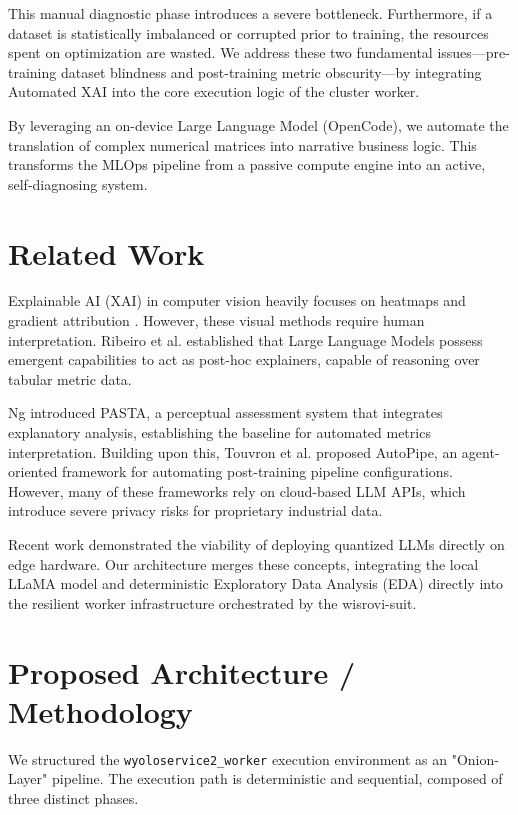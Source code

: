 \documentclass[10pt,twocolumn,letterpaper]{article}
\begin{document}
This manual diagnostic phase introduces a severe bottleneck. Furthermore, if a dataset is statistically imbalanced or corrupted prior to training, the resources spent on optimization are wasted. We address these two fundamental issues—pre-training dataset blindness and post-training metric obscurity—by integrating Automated XAI into the core execution logic of the cluster worker.

By leveraging an on-device Large Language Model (OpenCode), we automate the translation of complex numerical matrices into narrative business logic. This transforms the MLOps pipeline from a passive compute engine into an active, self-diagnosing system.

\section{Related Work}
Explainable AI (XAI) in computer vision heavily focuses on heatmaps and gradient attribution \cite{selvaraju2017grad, lundberg2017unified}. However, these visual methods require human interpretation. Ribeiro et al. \cite{ribeiro2016should} established that Large Language Models possess emergent capabilities to act as post-hoc explainers, capable of reasoning over tabular metric data. 

Ng \cite{ng2021data} introduced PASTA, a perceptual assessment system that integrates explanatory analysis, establishing the baseline for automated metrics interpretation. Building upon this, Touvron et al. \cite{touvron2023llama} proposed AutoPipe, an agent-oriented framework for automating post-training pipeline configurations. However, many of these frameworks rely on cloud-based LLM APIs, which introduce severe privacy risks for proprietary industrial data.

Recent work demonstrated the viability of deploying quantized LLMs directly on edge hardware. Our architecture merges these concepts, integrating the local LLaMA model \cite{touvron2023llama} and deterministic Exploratory Data Analysis (EDA) \cite{ng2021data} directly into the resilient worker infrastructure orchestrated by the wisrovi-suit.

\section{Proposed Architecture / Methodology}
We structured the \texttt{wyoloservice2\_worker} execution environment as an "Onion-Layer" pipeline. The execution path is deterministic and sequential, composed of three distinct phases.
\end{document}
